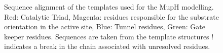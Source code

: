 		
			\setlength\fboxsep{5pt}
			\setlength\fboxrule{1.5pt}
			\begin{figure} []
			\centering
			\caption[Sequence alignment of the templates used for the MupH modelling.]{Sequence alignment of the templates used for the MupH modelling. Red: Catalytic Triad, Magenta: residues responsible for the substrate orientation in the active site, Blue: Tunnel residues, Green: Gate keeper residues. Sequences are taken from the template structures ! indicates a break in the chain associated with unresolved residues. }
			\label{fig:MuphModAli}
			\end{figure}
			

